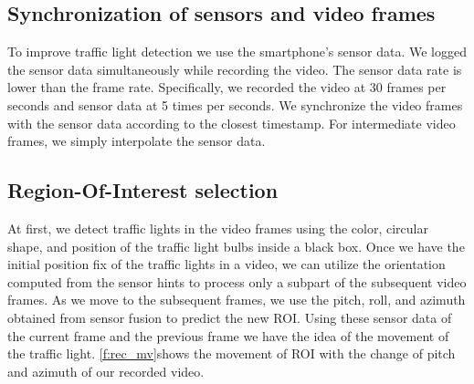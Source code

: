 \subsection{Synchronization of sensors and video frames}
To improve traffic light detection we use the smartphone's sensor data.
We logged the sensor data simultaneously while recording the video.
The sensor data rate is lower than the frame rate. 
Specifically, we recorded the video at 30 frames per seconds and sensor data at 5 times per seconds. 
We synchronize the video frames with the sensor data according to the closest timestamp.
For intermediate video frames, we simply interpolate the sensor data.



\subsection{Region-Of-Interest selection}
\label{s:roi}
At first, we detect traffic lights in the video frames using the color, circular shape, and position of the traffic light bulbs inside a black box.
Once we have the initial position fix of the traffic lights in a video, we can utilize the orientation computed from the sensor hints to process only a subpart of the subsequent video frames. 
As we move to the subsequent frames, we use the pitch, roll, and azimuth obtained from sensor fusion to predict the new ROI.
Using these sensor data of the current frame and the previous frame we have the idea of the movement of the traffic light.
\ref{f:rec_mv}shows the movement of ROI with the change of pitch and azimuth of our recorded video.

